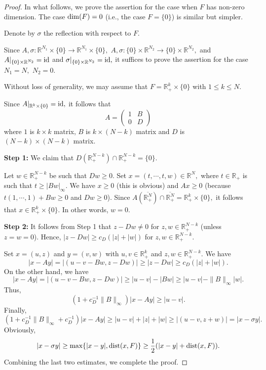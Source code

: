 \documentclass{amsart}
\begin{document}
\begin{proof} In what follows, we prove the assertion for the case when $F$ has non-zero dimension. The case ${\rm dim}(F)=0$ (i.e., the case $F=\{0\}$) is similar but simpler.

Denote by $\sigma$ the reflection with respect to $F.$

Since $A,\sigma:\mathbb{R}^{N_1}\times\{0\}\to\mathbb{R}^{N_1}\times\{0\},$  $A,\sigma:\{0\}\times\mathbb{R}^{N_2}\to\{0\}\times\mathbb{R}^{N_2},$ and $A|_{\{0\}\times\mathbb{R}^{N_2}}={\rm id}$ and $\sigma|_{\{0\}\times\mathbb{R}^{N_2}}={\rm id},$ it suffices to prove the assertion for the case $N_1=N,$ $N_2=0.$

Without loss of generality, we may assume that $F=\mathbb{R}^k_+\times\{0\}$ with $1\leq k\leq N.$


Since $A|_{\mathbb{R}^k\times\{0\}}={\rm id},$ it follows that
$$A=
\begin{pmatrix}
1&B\\
0&D
\end{pmatrix}
$$
where $1$ is $k\times k$ matrix, $B$ is $k\times(N-k)$ matrix and $D$ is $(N-k)\times(N-k)$ matrix.

{\bf Step 1:} We claim that $D(\mathbb{R}^{N-k}_+)\cap\mathbb{R}^{N-k}_+=\{0\}.$

Let $w\in\mathbb{R}^{N-k}_+$ be such that $Dw\geq0.$ Set $x=(t,\cdots,t,w)\in\mathbb{R}^N,$ where $t\in\mathbb{R}_+$ is such that $t\geq|Bw|_{\infty}.$ We have $x\geq0$ (this is obvious) and $Ax\geq0$ (because $t(1,\cdots,1)+Bw\geq0$ and $Dw\geq0$). Since $A(\overline{\mathbb{R}^N_+})\cap\overline{\mathbb{R}^N_+}=\mathbb{R}^k_+\times\{0\},$ it follows that $x\in \mathbb{R}^k_+\times\{0\}.$ In other words, $w=0.$

{\bf Step 2:} It follows from Step 1 that $z-Dw\neq0$ for $z,w\in\mathbb{R}^{N-k}_+$ (unless $z=w=0$). Hence,  $|z-Dw|\geq c_D(|z|+|w|)$ for $z,w\in\mathbb{R}^{N-k}_+.$

Set $x=(u,z)$ and $y=(v,w)$ with $u,v\in\mathbb{R}^k_+$ and $z,w\in\mathbb{R}^{N-k}_+.$ We have
$$|x-Ay|=|(u-v-Bw,z-Dw)|\geq |z-Dw|\geq c_D(|z|+|w|).$$
On the other hand, we have
$$|x-Ay|=|(u-v-Bw,z-Dw)|\geq |u-v|-|Bw|\geq |u-v|-\|B\|_{\infty}|w|.$$
Thus,
$$(1+c_D^{-1}\|B\|_{\infty})|x-Ay|\geq |u-v|.$$
Finally,
$$(1+c_D^{-1}\|B\|_{\infty}+c_D^{-1})|x-Ay|\geq |u-v|+|z|+|w|\geq|(u-v,z+w)|=|x-\sigma y|.$$
Obviously,
$$|x-\sigma y|\geq \max\{|x-y|,{\rm dist}(x,F)\}\geq\frac12(|x-y|+{\rm dist}(x,F)).$$
Combining the last two estimates, we complete the proof.
\end{proof}
\end{document}
